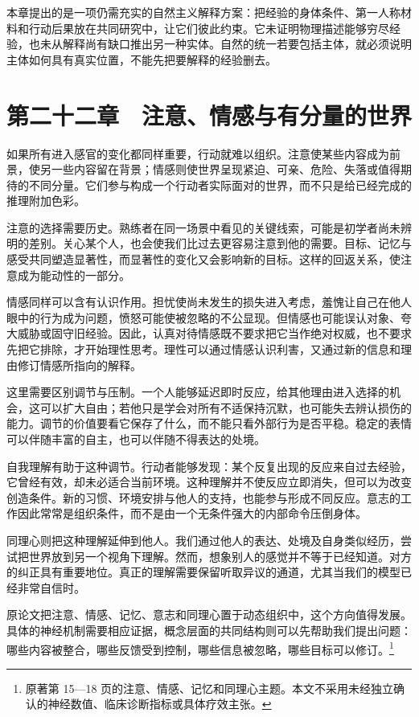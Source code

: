 \documentclass[
  11pt,
  oneside]{book}
\begin{document}
\begingroup{}

本章提出的是一项仍需充实的自然主义解释方案：把经验的身体条件、第一人称材料和行动后果放在共同研究中，让它们彼此约束。它未证明物理描述能够穷尽经验，也未从解释尚有缺口推出另一种实体。自然的统一若要包括主体，就必须说明主体如何具有真实位置，不能先把要解释的经验删去。

\par\endgroup

\chapter{第二十二章　注意、情感与有分量的世界}\label{ph-ch-22}

如果所有进入感官的变化都同样重要，行动就难以组织。注意使某些内容成为前景，使另一些内容留在背景；情感则使世界呈现紧迫、可亲、危险、失落或值得期待的不同分量。它们参与构成一个行动者实际面对的世界，而不只是给已经完成的推理附加色彩。

注意的选择需要历史。熟练者在同一场景中看见的关键线索，可能是初学者尚未辨明的差别。关心某个人，也会使我们比过去更容易注意到他的需要。目标、记忆与感受共同塑造显著性，而显著性的变化又会影响新的目标。这样的回返关系，使注意成为能动性的一部分。

情感同样可以含有认识作用。担忧使尚未发生的损失进入考虑，羞愧让自己在他人眼中的行为成为问题，愤怒可能使被忽略的不公显现。但情感也可能误认对象、夸大威胁或固守旧经验。因此，认真对待情感既不要求把它当作绝对权威，也不要求先把它排除，才开始理性思考。理性可以通过情感认识利害，又通过新的信息和理由修订情感所指向的解释。

这里需要区别调节与压制。一个人能够延迟即时反应，给其他理由进入选择的机会，这可以扩大自由；若他只是学会对所有不适保持沉默，也可能失去辨认损伤的能力。调节的价值要看它保存了什么，而不能只看外部行为是否平稳。稳定的表情可以伴随丰富的自主，也可以伴随不得表达的处境。

自我理解有助于这种调节。行动者能够发现：某个反复出现的反应来自过去经验，它曾经有效，却未必适合当前环境。这种理解并不使反应立即消失，但可以为改变创造条件。新的习惯、环境安排与他人的支持，也能参与形成不同反应。意志的工作因此常常是组织条件，而不是由一个无条件强大的内部命令压倒身体。

同理心则把这种理解延伸到他人。我们通过他人的表达、处境及自身类似经历，尝试把世界放到另一个视角下理解。然而，想象别人的感觉并不等于已经知道。对方的纠正具有重要地位。真正的理解需要保留听取异议的通道，尤其当我们的模型已经非常自信时。

原论文把注意、情感、记忆、意志和同理心置于动态组织中，这个方向值得发展。具体的神经机制需要相应证据，概念层面的共同结构则可以先帮助我们提出问题：哪些内容被整合，哪些反馈受到控制，哪些信息被忽略，哪些目标可以修订。\footnote{\hypertarget{ph-note-53}{}原著第 15---18 页的注意、情感、记忆和同理心主题。本文不采用未经独立确认的神经数值、临床诊断指标或具体疗效主张。}
\end{document}
